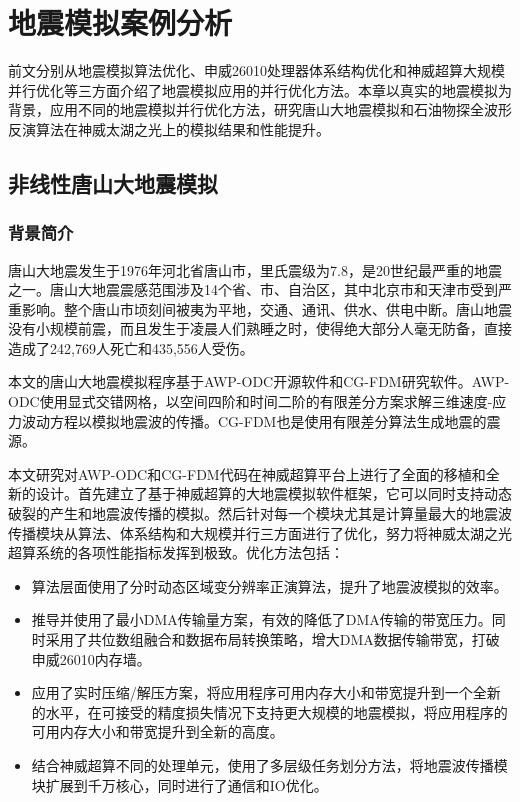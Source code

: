 \chapter{地震模拟案例分析} %
\label{cha:地震模拟案例分析}

前文分别从地震模拟算法优化、申威26010处理器体系结构优化和神威超算大规模并行优化等三方面介绍了地震模拟应用的并行优化方法。本章以真实的地震模拟为背景，应用不同的地震模拟并行优化方法，研究唐山大地震模拟和石油物探全波形反演算法在神威太湖之光上的模拟结果和性能提升。

\section{非线性唐山大地震模拟}

\subsection{背景简介}

唐山大地震发生于1976年河北省唐山市，里氏震级为7.8，是20世纪最严重的地震之一。唐山大地震震感范围涉及14个省、市、自治区，其中北京市和天津市受到严重影响。整个唐山市顷刻间被夷为平地，交通、通讯、供水、供电中断。唐山地震没有小规模前震，而且发生于凌晨人们熟睡之时，使得绝大部分人毫无防备，直接造成了242,769人死亡和435,556人受伤。

本文的唐山大地震模拟程序基于AWP-ODC\cite{cui2010scalable}开源软件和CG-FDM\citep{zhang2014three}研究软件。AWP-ODC使用显式交错网格，以空间四阶和时间二阶的有限差分方案求解三维速度-应力波动方程以模拟地震波的传播。CG-FDM也是使用有限差分算法生成地震的震源。

本文研究对AWP-ODC和CG-FDM代码在神威超算平台上进行了全面的移植和全新的设计。首先建立了基于神威超算的大地震模拟软件框架，它可以同时支持动态破裂的产生和地震波传播的模拟。然后针对每一个模块尤其是计算量最大的地震波传播模块从算法、体系结构和大规模并行三方面进行了优化，努力将神威太湖之光超算系统的各项性能指标发挥到极致。优化方法包括：
\begin{itemize}
  \item 算法层面使用了分时动态区域变分辨率正演算法，提升了地震波模拟的效率。
  \item 推导并使用了最小DMA传输量方案，有效的降低了DMA传输的带宽压力。同时采用了共位数组融合和数据布局转换策略，增大DMA数据传输带宽，打破申威26010内存墙。
  \item 应用了实时压缩/解压方案，将应用程序可用内存大小和带宽提升到一个全新的水平，在可接受的精度损失情况下支持更大规模的地震模拟，将应用程序的可用内存大小和带宽提升到全新的高度。
  \item 结合神威超算不同的处理单元，使用了多层级任务划分方法，将地震波传播模块扩展到千万核心，同时进行了通信和IO优化。
\end{itemize}

